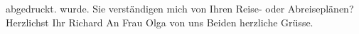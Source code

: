 \begin{ledgroupsized}[t]{13cm}
{{{                  abgedruckt.}}}\label{K_L01697_1h} wurde.\pend
           \pstart
           Sie verständigen mich von Ihren Reise- oder Abreiseplänen?\pend
           \pstart Herzlichst Ihr \spacefill\mbox{Richard}\pend{}\pstart
           An Frau Olga von uns Beiden herzliche Grüsse.\pend
           \endnumbering{}\end{ledgroupsized}  \newcommand{\dateiname}{L01697}\newcommand{\titel}{Richard Beer-Hofmann an Arthur Schnitzler, 30. 7. 1907}\newcommand{\editorInnen}{Martin Anton Müller und Gerd-Hermann Susen}
            \footnotesize
\begin{ledgroupsized}[t]{11.5cm}
\end{ledgroupsized}
         
      